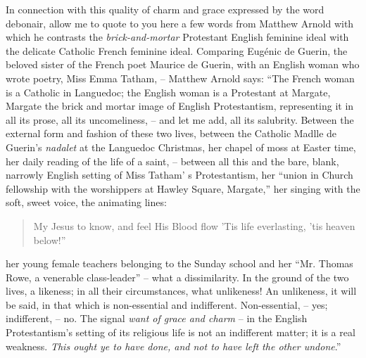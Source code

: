 In connection with this quality of charm and grace expressed by the word debonair,
allow me to quote to you here a few words from Matthew Arnold with which he contrasts the \emph{brick-and-mortar} Protestant English feminine ideal with the delicate Catholic French feminine ideal.
Comparing Eug\'enic de Guerin, the beloved sister of the French poet Maurice de Guerin,
with an English woman who wrote poetry, Miss Emma Tatham,
-- Matthew Arnold says: ``The French woman is a Catholic in Languedoc; the English woman is a Protestant at Margate, Margate the brick and mortar image of English Protestantism, representing it in all its prose, all its uncomeliness,  -- and let me add, all its salubrity.
Between the external form and fashion of these two lives,
between the Catholic Madlle de Guerin's \emph{nadalet} at the Languedoc Christmas,
her chapel of moss at Easter time,
her daily reading of the life of a saint,
-- between all this and the bare, blank, narrowly English setting of Miss Tatham' s Protestantism,
her ``union in Church fellowship with the worshippers at Hawley Square, Margate,''
her singing with the soft, sweet voice, the animating lines:
\begin{quote}
My Jesus to know, and feel His Blood flow
'Tis life everlasting, 'tis heaven below!''
\end{quote}
her young female teachers belonging to the Sunday school and her
``Mr. Thomas Rowe, a venerable class-leader''
-- what a dissimilarity.
In the ground of the two lives, a likeness;
in all their circumstances, what unlikeness!
An unlikeness, it will be said, in that which is non-essential and indifferent. Non-essential, -- yes;
indifferent, -- no.
The signal \emph{want of grace and charm}
-- in the English Protestantism's setting of its religious life is not an indifferent matter;
it is a real weakness.
\emph{This ought ye to have done, and not to have left the other undone}.''


